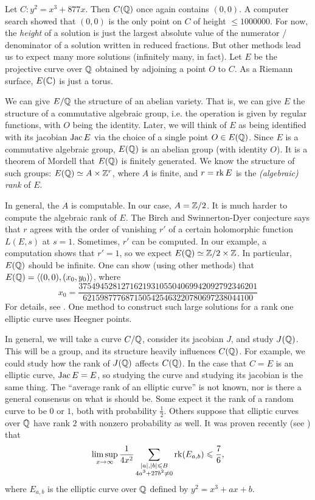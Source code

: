 \documentclass{article}
\begin{document}
\begin{example}
Let $C:y^2=x^3+877 x$. Then $C(\mathbb{Q})$ once again contains $(0,0)$. A 
computer search showed that $(0,0)$ is the only point on $C$ of height 
$\leqslant 1000000$. For now, the \emph{height} of a solution is just the 
largest absolute value of the numerator / denominator of a solution written 
in reduced fractions. But other methods lead us to expect many more solutions
(infinitely many, in fact). Let $E$ be the projective curve over $\mathbb{Q}$ obtained 
by adjoining a point $O$ to $C$. As a Riemann surface, $E(\mathbb{C})$ is just a 
torus. 

We can give $E/\mathbb{Q}$ the 
structure of an abelian variety. That is, we can give $E$ the structure of a 
commutative algebraic group, i.e. the operation is given by regular  
functions, with $O$ being the identity. Later, we will think of $E$ as 
being identified with its jacobian $\operatorname{Jac} E$ via the choice of a single point 
$O\in E(\mathbb{Q})$. Since $E$ is a commutative algebraic group, $E(\mathbb{Q})$ is an 
abelian group (with identity $O$). It is a theorem of Mordell that $E(\mathbb{Q})$ is 
finitely generated. We know the structure of such groups: 
$E(\mathbb{Q})\simeq A\times \mathbb{Z}^r$, where $A$ is finite, and $r=\operatorname{rk} E$ 
is the \emph{(algebraic) rank} of $E$. 

In general, the $A$ is computable. In our case, $A=\mathbb{Z}/2$. It is much harder to 
compute the algebraic rank of $E$. The Birch and Swinnerton-Dyer 
conjecture says that $r$ agrees with the order of vanishing $r'$ of a certain 
holomorphic function $L(E,s)$ at $s=1$. Sometimes, $r'$ can be computed.  
In our example, a computation shows that $r'=1$, so we expect 
$E(\mathbb{Q})\simeq \mathbb{Z}/2\times\mathbb{Z}$. In particular, 
$E(\mathbb{Q})$ should be infinite. One can show (using other methods) that 
$E(\mathbb{Q})=\langle (0,0),(x_0,y_0)\rangle$, where 
\[
  x_0 = \frac{37 5494 5281 2716 2193 1055 0406 9942 0927 9234 6201}{6215 9877 7687 1505 4254 6322 0780 6972 3804 4100}
\]
For details, see \cite{br84}. One method to construct such large solutions for 
a rank one elliptic curve uses Heegner points. 
\end{example}

In general, we will take a curve $C/\mathbb{Q}$, consider its jacobian $J$, and study 
$J(\mathbb{Q})$. This will be a group, and its structure heavily influences $C(\mathbb{Q})$. 
For example, we could study how the rank of $J(\mathbb{Q})$ affects $C(\mathbb{Q})$. In the 
case that $C=E$ is an elliptic curve, $\operatorname{Jac} E=E$, so studying the curve and 
studying its jacobian is the same thing. The ``average rank of an elliptic 
curve'' is not known, nor is there a general consensus on what is should be. 
Some expect it the rank of a random curve to be $0$ or $1$, both with 
probability $\frac 1 2$. Others suppose that elliptic curves over $\mathbb{Q}$ have 
rank $2$ with nonzero probability as well. It was proven recently (see 
\cite[\S 1]{bh10}) that 
\[
  \limsup_{x\to\infty} \frac{1}{4 x^2} \sum_{\substack{|a|,|b|\leqslant B \\ 4 a^3+27 b^2\ne 0}} \operatorname{rk}(E_{a,b}) \leqslant\frac 7 6 \text{,}
\]
where $E_{a,b}$ is the elliptic curve over $\mathbb{Q}$ defined by $y^2=x^3 +a x+b$.
\end{document}
